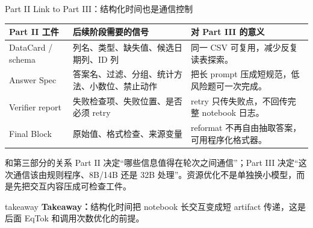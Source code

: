 \documentclass[aspectratio=169,UTF8]{ctexbeamer}
\newcommand{\takeaway}[1]{%
  \vspace{0.18em}
  \begin{beamercolorbox}[wd=\textwidth,sep=0.42ex,rounded=true,leftskip=0.75em,rightskip=0.75em]{takeaway}
    \scriptsize\textbf{\textcolor{DWBlue}{Takeaway：}}#1
  \end{beamercolorbox}
}
\begin{document}
\begin{frame}{Part II Link to Part III：结构化时间也是通信控制}
\scriptsize
\begin{tabularx}{\textwidth}{p{} p{} X}
\toprule
Part II 工件 & 后续阶段需要的信号 & 对 Part III 的意义 \\
\midrule
DataCard / schema &
列名、类型、缺失值、候选日期列、ID 列 &
同一 CSV 可复用，减少反复读表探索。 \\
Answer Spec &
答案名、过滤、分组、统计方法、小数位、禁止动作 &
把长 prompt 压成短规范，低风险题可一次完成。 \\
Verifier report &
失败检查项、失败位置、是否必须 retry &
retry 只传失败点，不回传完整 notebook 日志。 \\
Final Block &
原始值、格式检查、来源变量 &
reformat 不再自由抽取答案，可用程序化格式器。 \\
\bottomrule
\end{tabularx}
\vspace{0.35em}
\begin{block}{和第三部分的关系}
Part II 决定“哪些信息值得在轮次之间通信”；Part III 决定“这次通信该由规则程序、8B/14B 还是 32B 处理”。资源优化不是单独换小模型，而是先把交互内容压成可检查工件。
\end{block}
\takeaway{结构化时间把 notebook 长交互变成短 artifact 传递，这是后面 EqTok 和调用次数优化的前提。}
\end{frame}
\end{document}
